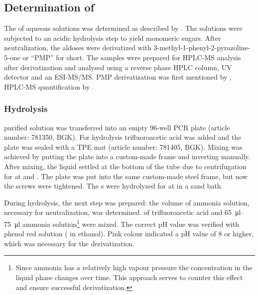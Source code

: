 \subsection{Determination of \AMC{}\label{aldose-composition}}
The \amc{} of aqueous \eps{} solutions was determined as described by \textcite{Ruehmann2014, Ruehmann2015a}. The \eps{} solutions were subjected to an acidic hydrolysis step to yield monomeric sugars. After neutralization, the aldoses were derivatized with 3-methyl-1-phenyl-2-pyrazoline-5-one or \enquote{PMP} for short. The samples were prepared for HPLC-MS analysis after derivatization and analysed using a reverse phase HPLC column, UV detector and an ESI-MS/MS. PMP derivatization was first mentioned by \textcite{Honda1989}, HPLC-MS quantification by \textcite{McRae2011}.

\subsubsection{Hydrolysis\label{pmp-hydrolysis}}
 purified \eps{} solution was transferred into an empty 96-well PCR plate (article number: 781350, BGK). For hydrolysis   trifluoroacetic acid was added and the plate was sealed with a TPE mat (article number: 781405, BGK). Mixing was achieved by putting the plate into a custom-made frame and inverting manually. After mixing, the liquid settled at the bottom of the tube due to centrifugation for  at  and . The plate was put into the same custom-made steel frame, but now the screws were tightened. The \eps{}s were hydrolyzed for  at  in a sand bath. %

During hydrolysis, the next step was prepared: the volume of  ammonia solution, necessary for neutralization, was determined.  of  trifluoroacetic acid and \SIrange{65}{75}{\micro\litre}  ammonia solution\footnote{Since ammonia has a relatively high vapour pressure the concentration in the liquid phase changes over time. This approach serves to counter this effect and ensure successful derivatization.} were mixed. The correct pH value was verified with  phenol red solution ( in  ethanol). Pink colour indicated a pH value of 8 or higher, which was necessary for the derivatization.

